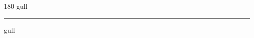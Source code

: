 
\begin{frame}
\begin{center}
\begin{turn}{180}
{\fontsize{2.5cm}{1em}\selectfont gull}
\end{turn}
\vspace{1em}\par  
\hrule
\vspace{1em}\par  
{\fontsize{2.5cm}{1em}\selectfont gull}
\end{center}
\end{frame}
